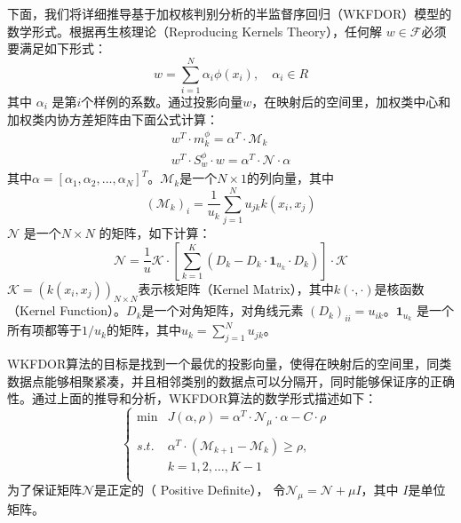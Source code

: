 下面，我们将详细推导基于加权核判别分析的半监督序回归（WKFDOR）模型的数学形式。根据再生核理论（Reproducing Kernels Theory），任何解 \(w\in \mathcal{F}\)必须要满足如下形式：
\begin{equation}
\label{kernel_w}
w=\sum_{i=1}^{N}\alpha_{i}\phi(x_{i}),\quad \alpha_{i} \in R
\end{equation}
其中 \(\alpha_{i}\) 是第\(i\)个样例的系数。通过投影向量\(w\)，在映射后的空间里，加权类中心和加权类内协方差矩阵由下面公式计算：
\begin{gather}
\label{project_mean}
w^{T} \cdot m^{\phi}_{k}=\alpha^{T} \cdot \mathcal{M}_{k} \\
\label{project_cov}
w^{T} \cdot S^{\phi}_{w} \cdot w=\alpha^{T} \cdot \mathcal{N} \cdot \alpha
\end{gather}
其中\(\alpha=[\alpha_{1},\alpha_{2},\dots,\alpha_{N}]^{T}\)。\(\mathcal{M}_{k}\)是一个\(N \times 1\)的列向量，其中
\begin{equation}
\label{M}
(\mathcal{M}_{k})_{i}=\frac{1}{u_{k}}\sum_{j=1}^{N}u_{jk}  k(x_{i},x_{j})
\end{equation}
\(\mathcal{N}\) 是一个\(N\times N\) 的矩阵，如下计算：
\begin{equation}
\label{N}
\mathcal{N}=\frac{1}{u}\mathcal{K}\cdot[\sum_{k=1}^{K}(D_{k}-D_{k} \cdot \mathbf{1}_{u_{k}} \cdot D_{k})]\cdot \mathcal{K}
\end{equation}
\(\mathcal{K}=(k(x_{i},x_{j}))_{N \times N}\)表示核矩阵（Kernel Matrix），其中\(k(\cdot,\cdot)\)是核函数（Kernel Function）。\(D_{k}\)是一个对角矩阵，对角线元素 \((D_{k})_{ii}=u_{ik}\)。\(\mathbf{1}_{u_{k}}\) 是一个所有项都等于\(1/u_k\)的矩阵，其中\(u_{k}=\sum_{j=1}^{N}u_{jk}\)。

WKFDOR算法的目标是找到一个最优的投影向量，使得在映射后的空间里，同类数据点能够相聚紧凑，并且相邻类别的数据点可以分隔开，同时能够保证序的正确性。通过上面的推导和分析，WKFDOR算法的数学形式描述如下：
\begin{equation}
\label{wkfdor}
\left\{\begin{array}{rll} \min & J(\alpha,\rho)=\alpha^{T}\cdot \mathcal{N}_{\mu} \cdot \alpha-C\cdot \rho& \\
\\
s.t. & \alpha^{T}\cdot (\mathcal{M}_{k+1}-\mathcal{M}_{k})\geq\rho,{} \\
     & k = 1,2,\dots,K-1\\

\end{array}
\right.
\end{equation}
为了保证矩阵\(\mathcal{N}\)是正定的（ Positive Definite）， 令\(\mathcal{N}_{\mu}=\mathcal{N}+\mu I\)，其中
\(I\)是单位矩阵。

